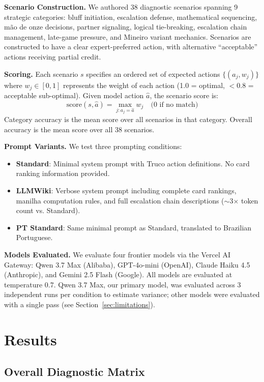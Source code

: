 \documentclass[11pt]{article}
\begin{document}
\textbf{Scenario Construction.} We authored 38 diagnostic scenarios spanning 9 strategic categories: bluff initiation, escalation defense, mathematical sequencing, mão de onze decisions, partner signaling, logical tie-breaking, escalation chain management, late-game pressure, and Mineiro variant mechanics. Scenarios are constructed to have a clear expert-preferred action, with alternative ``acceptable'' actions receiving partial credit.

\textbf{Scoring.} Each scenario $s$ specifies an ordered set of expected actions $\{(a_j, w_j)\}$ where $w_j \in [0, 1]$ represents the weight of each action (1.0 = optimal, $<$0.8 = acceptable sub-optimal). Given model action $\hat{a}$, the scenario score is:
\begin{equation}
    \text{score}(s, \hat{a}) = \max_{j: a_j = \hat{a}} w_j \quad \text{(0 if no match)}
\end{equation}
Category accuracy is the mean score over all scenarios in that category. Overall accuracy is the mean score over all 38 scenarios.

\textbf{Prompt Variants.} We test three prompting conditions:
\begin{itemize}
    \item \textbf{Standard}: Minimal system prompt with Truco action definitions. No card ranking information provided.
    \item \textbf{LLMWiki}: Verbose system prompt including complete card rankings, manilha computation rules, and full escalation chain descriptions ($\sim$3$\times$ token count vs. Standard).
    \item \textbf{PT Standard}: Same minimal prompt as Standard, translated to Brazilian Portuguese.
\end{itemize}

\textbf{Models Evaluated.} We evaluate four frontier models via the Vercel AI Gateway: Qwen 3.7 Max (Alibaba), GPT-4o-mini (OpenAI), Claude Haiku 4.5 (Anthropic), and Gemini 2.5 Flash (Google). All models are evaluated at temperature 0.7. Qwen 3.7 Max, our primary model, was evaluated across 3 independent runs per condition to estimate variance; other models were evaluated with a single pass (see Section~\ref{sec:limitations}).

\section{Results}

\subsection{Overall Diagnostic Matrix}
\end{document}
